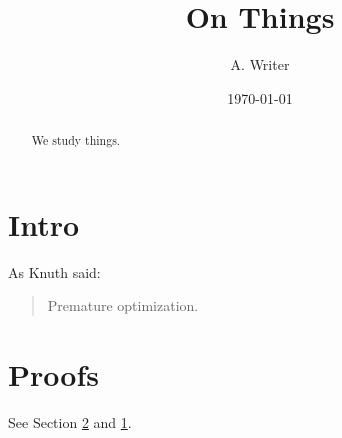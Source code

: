 \documentclass{article}
\title{On Things}
\author{A. Writer}
\date{\today}
\begin{document}
\maketitle
\begin{abstract}
We study things.
\end{abstract}
\tableofcontents
\section{Intro}\label{s1}
As Knuth said:
\begin{quote}
Premature optimization.
\end{quote}
\appendix
\section{Proofs}\label{pa}
See Section \ref{pa} and \ref{s1}.
\end{document}
